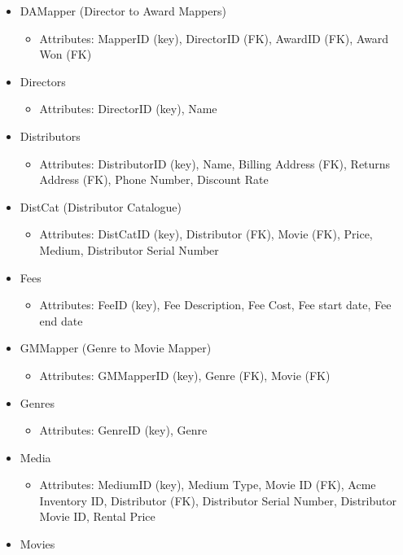 \documentclass[letterpaper,12pt]{article}
\begin{document}
\begin{itemize}
	\item DAMapper (Director to Award Mappers)
	      \begin{itemize}
		      \item Attributes: MapperID (key), DirectorID (FK), AwardID (FK), Award Won (FK)
	      \end{itemize}
	\item Directors
	      \begin{itemize}
		      \item Attributes: DirectorID (key), Name
	      \end{itemize}
	\item Distributors
	      \begin{itemize}
		      \item Attributes: DistributorID (key), Name, Billing Address (FK), Returns Address (FK), Phone Number, Discount Rate
	      \end{itemize}
	\item DistCat (Distributor Catalogue)
	      \begin{itemize}
		      \item Attributes: DistCatID (key), Distributor (FK), Movie (FK), Price, Medium, Distributor Serial Number
	      \end{itemize}
	\item Fees
	      \begin{itemize}
		      \item Attributes: FeeID (key), Fee Description, Fee Cost, Fee start date, Fee end date
	      \end{itemize}
	\item GMMapper (Genre to Movie Mapper)
	      \begin{itemize}
		      \item Attributes: GMMapperID (key), Genre (FK), Movie (FK)
	      \end{itemize}
	\item Genres
	      \begin{itemize}
		      \item Attributes: GenreID (key), Genre
	      \end{itemize}
	\item Media
	      \begin{itemize}
		      \item Attributes: MediumID (key), Medium Type, Movie ID (FK), Acme Inventory ID, Distributor (FK), Distributor Serial Number, Distributor Movie ID, Rental Price
	      \end{itemize}
	\item Movies

\end{itemize}
\end{document}
